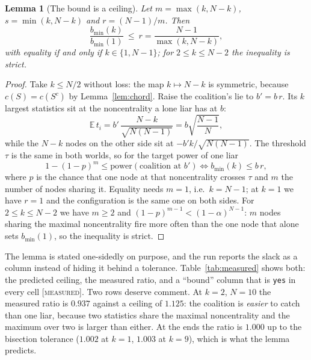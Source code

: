 \documentclass[10pt,twocolumn,a4paper]{article}
\newcommand{\measured}{\textcolor{blue!70!black}{\textsc{[measured]}}}
\newtheorem{lemma}[theorem]{Lemma}
\theoremstyle{definition}
\theoremstyle{remark}
\newcommand{\bmin}{b_{\min}}
\newcommand{\taur}{\tau}
\begin{document}
\begin{lemma}[The bound is a ceiling]
\label{lem:bound}
Let $m=\max(k,N-k)$, $s=\min(k,N-k)$ and $r=(N-1)/m$. Then
\begin{equation}
\frac{\bmin(k)}{\bmin(1)}\ \le\ r=\frac{N-1}{\max(k,N-k)},
\label{eq:bound}
\end{equation}
with equality if and only if $k\in\{1,N-1\}$; for $2\le k\le N-2$ the inequality
is strict.
\end{lemma}

\begin{proof}
Take $k\le N/2$ without loss: the map $k\mapsto N-k$ is symmetric, because
$c(S)=c(S^c)$ by Lemma~\ref{lem:chord}. Raise the coalition's lie to
$b'=b\,r$. Its $k$ largest statistics sit at the noncentrality a lone liar has at
$b$:
\begin{equation}
\mathbb E\,t_i=b'\,\frac{N-k}{\sqrt{N(N-1)}}=b\sqrt{\frac{N-1}{N}},
\label{eq:lemma-mean}
\end{equation}
while the $N-k$ nodes on the other side sit at $-b'k/\sqrt{N(N-1)}$. The threshold
$\taur$ is the same in both worlds, so for the target power of one liar
\begin{equation}
1-(1-p)^{m}\le\mathrm{power}(\text{coalition at }b')
\iff \bmin(k)\le b\,r ,
\label{eq:lemma-power}
\end{equation}
where $p$ is the chance that one node at that noncentrality crosses $\taur$ and
$m$ the number of nodes sharing it. Equality needs $m=1$, i.e.\ $k=N-1$; at
$k=1$ we have $r=1$ and the configuration is the same one on both sides. For
$2\le k\le N-2$ we have $m\ge2$ and
$(1-p)^{m-1}<(1-\alpha)^{N-1}$: $m$ nodes sharing the maximal noncentrality fire
more often than the one node that alone sets $\bmin(1)$, so the inequality is
strict.
\end{proof}

The lemma is stated one-sidedly on purpose, and the run reports the slack as a
column instead of hiding it behind a tolerance. Table~\ref{tab:measured} shows
both: the predicted ceiling, the measured ratio, and a ``bound'' column that is
\texttt{yes} in every cell \measured. Two rows deserve comment. At $k=2$, $N=10$
the measured ratio is $0.937$ against a ceiling of $1.125$: the coalition is
\emph{easier} to catch than one liar, because two statistics share the maximal
noncentrality and the maximum over two is larger than either. At the ends the
ratio is $1.000$ up to the bisection tolerance ($1.002$ at $k=1$, $1.003$ at
$k=9$), which is what the lemma predicts.
\end{document}
